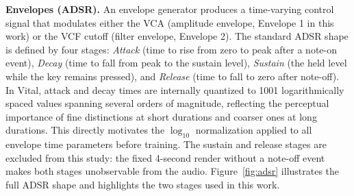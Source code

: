 \par \vspace{0.3cm}

\noindent \textbf{Envelopes (ADSR).} An envelope generator produces a time-varying control signal that modulates either the VCA (amplitude envelope, Envelope 1 in this work) or the VCF cutoff (filter envelope, Envelope 2). The standard ADSR shape is defined by four stages: \textit{Attack} (time to rise from zero to peak after a note-on event), \textit{Decay} (time to fall from peak to the sustain level), \textit{Sustain} (the held level while the key remains pressed), and \textit{Release} (time to fall to zero after note-off). In Vital, attack and decay times are internally quantized to 1001 logarithmically spaced values spanning several orders of magnitude, reflecting the perceptual importance of fine distinctions at short durations and coarser ones at long durations. This directly motivates the $\log_{10}$ normalization applied to all envelope time parameters before training. The sustain and release stages are excluded from this study: the fixed 4-second render without a note-off event makes both stages unobservable from the audio. Figure~\ref{fig:adsr} illustrates the full ADSR shape and highlights the two stages used in this work.

